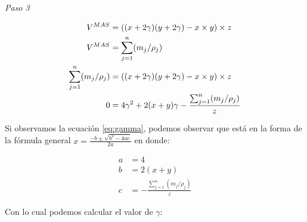 \documentclass[
]{book}
\begin{document}
\emph{Paso 3}

\begin{align}
V^{MAS}&=\left( (x+2\gamma)(y+2\gamma)-x \times y \right) \times z \notag \\
V^{MAS}&=\sum_{j=1}^n(m_j / \rho_j) \notag \\
\sum_{j=1}^n(m_j / \rho_j) &= \left( (x+2\gamma)(y+2\gamma)-x \times y \right) 
\times z \notag \\
0 &= 4\gamma^2+2(x+y)\gamma-\frac{\sum_{j=1}^n(m_j / \rho_j)}{z} \label{eq:gamma}
\end{align}

Si observamos la ecuación \eqref{eq:gamma}, podemos observar que está en la
forma de la fórmula general \(x=\frac{-b\pm\sqrt{b^2-4ac}}{2a}\) en donde:

\begin{align}
a &= 4 \\
b &= 2(x+y) \\
c &= -\frac{\sum_{j=1}^n(m_j / \rho_j)}{z}
\end{align}

Con lo cual podemos calcular el valor de \(\gamma\):
\end{document}
